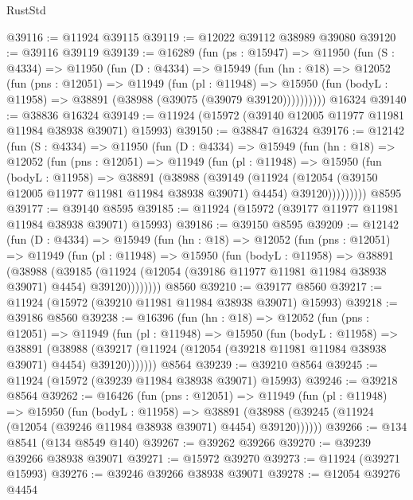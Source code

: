 \begin{lexlean}{RustStd}
\begin{coremodule}
@39116 := @11924 @39115
@39119 := @12022 @39112 @38989 @39080
@39120 := @39116 @39119
@39139 := @16289
    (fun (ps : @15947) =>
    @11950
      (fun (S : @4334) =>
      @11950
        (fun (D : @4334) =>
        @15949
          (fun (hn : @18) =>
          @12052
            (fun (pns : @12051) =>
            @11949
              (fun (pl : @11948) =>
              @15950 (fun (bodyL : @11958) => @38891 (@38988 (@39075 (@39079 @39120))))))))))
    @16324
@39140 := @38836 @16324
@39149 := @11924 (@15972 (@39140 @12005 @11977 @11981 @11984 @38938 @39071) @15993)
@39150 := @38847 @16324
@39176 := @12142
    (fun (S : @4334) =>
    @11950
      (fun (D : @4334) =>
      @15949
        (fun (hn : @18) =>
        @12052
          (fun (pns : @12051) =>
          @11949
            (fun (pl : @11948) =>
            @15950
              (fun (bodyL : @11958) =>
              @38891
                (@38988
                  (@39149
                    (@11924
                      (@12054 (@39150 @12005 @11977 @11981 @11984 @38938 @39071) @4454)
                      @39120)))))))))
    @8595
@39177 := @39140 @8595
@39185 := @11924 (@15972 (@39177 @11977 @11981 @11984 @38938 @39071) @15993)
@39186 := @39150 @8595
@39209 := @12142
    (fun (D : @4334) =>
    @15949
      (fun (hn : @18) =>
      @12052
        (fun (pns : @12051) =>
        @11949
          (fun (pl : @11948) =>
          @15950
            (fun (bodyL : @11958) =>
            @38891
              (@38988
                (@39185
                  (@11924 (@12054 (@39186 @11977 @11981 @11984 @38938 @39071) @4454) @39120))))))))
    @8560
@39210 := @39177 @8560
@39217 := @11924 (@15972 (@39210 @11981 @11984 @38938 @39071) @15993)
@39218 := @39186 @8560
@39238 := @16396
    (fun (hn : @18) =>
    @12052
      (fun (pns : @12051) =>
      @11949
        (fun (pl : @11948) =>
        @15950
          (fun (bodyL : @11958) =>
          @38891
            (@38988
              (@39217 (@11924 (@12054 (@39218 @11981 @11984 @38938 @39071) @4454) @39120)))))))
    @8564
@39239 := @39210 @8564
@39245 := @11924 (@15972 (@39239 @11984 @38938 @39071) @15993)
@39246 := @39218 @8564
@39262 := @16426
    (fun (pns : @12051) =>
    @11949
      (fun (pl : @11948) =>
      @15950
        (fun (bodyL : @11958) =>
        @38891 (@38988 (@39245 (@11924 (@12054 (@39246 @11984 @38938 @39071) @4454) @39120))))))
@39266 := @134 @8541 (@134 @8549 @140)
@39267 := @39262 @39266
@39270 := @39239 @39266 @38938 @39071
@39271 := @15972 @39270
@39273 := @11924 (@39271 @15993)
@39276 := @39246 @39266 @38938 @39071
@39278 := @12054 @39276 @4454

\end{coremodule}
\end{lexlean}
